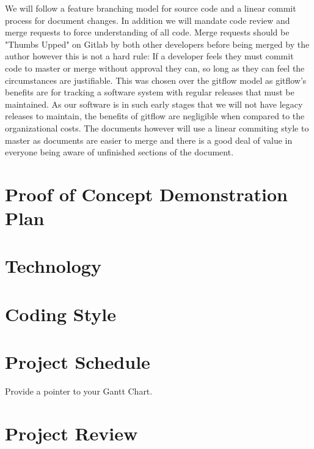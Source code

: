 \documentclass{article}
\begin{document}
We will follow a feature branching model for source code and a linear commit process for document changes.
In addition we will mandate code review and merge requests to force understanding of all code.
Merge requests should be "Thumbs Upped" on Gitlab by both other developers before being merged by the author however this is not a hard rule:
If a developer feels they must commit code to master or merge without approval they can, so long as they can feel the circumstances are justifiable.
This was chosen over the gitflow model as gitflow's benefits are for tracking a software system with regular releases that must be maintained.
As our software is in such early stages that we will not have legacy releases to maintain, the benefits of gitflow are negligible when compared to the organizational costs.
The documents however will use a linear commiting style to master as documents are easier to merge and there is a good deal of value in everyone being aware of unfinished sections of the document.

\section{Proof of Concept Demonstration Plan}

\section{Technology}

\section{Coding Style}

\section{Project Schedule}

Provide a pointer to your Gantt Chart.

\section{Project Review}
\end{document}
